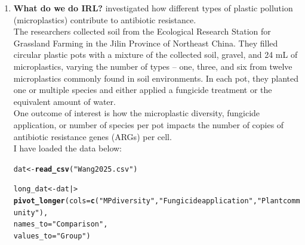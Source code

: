 \documentclass{article}\usepackage[]{graphicx}\usepackage[]{xcolor}
\makeatletter
\newcommand{\hlsng}[1]{\textcolor[rgb]{0.192,0.494,0.8}{#1}}%
\newcommand{\hldef}[1]{\textcolor[rgb]{0.345,0.345,0.345}{#1}}%
\newcommand{\hlkwb}[1]{\textcolor[rgb]{0.69,0.353,0.396}{#1}}%
\newcommand{\hlkwc}[1]{\textcolor[rgb]{0.333,0.667,0.333}{#1}}%
\newcommand{\hlkwd}[1]{\textcolor[rgb]{0.737,0.353,0.396}{\textbf{#1}}}%
\newenvironment{kframe}{%
 \def\at@end@of@kframe{}%
 \ifinner\ifhmode%
  \def\at@end@of@kframe{\end{minipage}}%
  \begin{minipage}{\columnwidth}%
 \fi\fi%
 \def\FrameCommand##1{\hskip\@totalleftmargin \hskip-\fboxsep
 \colorbox{shadecolor}{##1}\hskip-\fboxsep
     \hskip-\linewidth \hskip-\@totalleftmargin \hskip\columnwidth}%
 \MakeFramed {\advance\hsize-\width
   \@totalleftmargin\z@ \linewidth\hsize
   \@setminipage}}%
 {\par\unskip\endMakeFramed%
 \at@end@of@kframe}
\newenvironment{knitrout}{}{} %
\makeatother
\begin{document}
\begin{enumerate}
\begin{enumerate}
\item In as few words as possible, describe a hypothesis test. Your solution
must include reference(s) to a statistic and a sampling distribution either 
directly or indirectly.

\textcolor{red}{We're testing how weird a statistic calculated of of our data is given an assumed random distribution of that statistic.}

\end{enumerate}
\item \textbf{What do we do IRL?} \cite{Wang24} investigated how different
types of plastic pollution (microplastics) contribute to antibiotic resistance.\\

The researchers collected soil from the Ecological Research Station for 
Grassland Farming in the Jilin Province of Northeast China. They filled
circular plastic pots with a mixture of the collected soil, gravel, and 24 mL 
of microplastics, varying the number of types -- one, three, and six from
twelve microplastics commonly found in soil environments. In each pot, they 
planted one or multiple species and either applied a fungicide treatment
or the equivalent amount of water.\\

One outcome of interest is how the microplastic diversity, fungicide 
application, or number of species per pot impacts the number of copies
of antibiotic resistance genes (ARGs) per cell.\\

I have loaded the data below:
\begin{knitrout}\scriptsize
{}\color{fgcolor}\begin{kframe}
\begin{alltt}
\hldef{dat} \hlkwb{<-} \hlkwd{read_csv}\hldef{(}\hlsng{"Wang2025.csv"}\hldef{)}

\hldef{long_dat} \hlkwb{<-} \hldef{dat |>}
  \hlkwd{pivot_longer}\hldef{(}\hlkwc{cols} \hldef{=} \hlkwd{c}\hldef{(}\hlsng{"MP diversity"}\hldef{,} \hlsng{"Fungicide application"}\hldef{,} \hlsng{"Plant community"}\hldef{),}
               \hlkwc{names_to} \hldef{=} \hlsng{"Comparison"}\hldef{,}
               \hlkwc{values_to} \hldef{=} \hlsng{"Group"}\hldef{)}


\end{alltt}
\end{kframe}
\end{knitrout}
\end{enumerate}
\end{document}
